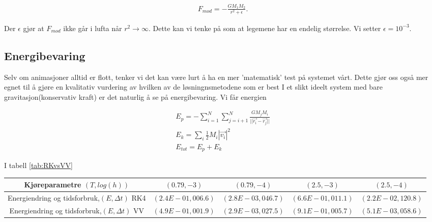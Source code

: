 \documentclass[11pt, twocolumn]{article}
\begin{document}
\begin{align}
F_{mod} = -\frac{GM_1M_2}{r^2 + \epsilon}.
\end{align}

Der $\epsilon$ gjør at $F_{mod}$ ikke går i lufta når $r^2 \rightarrow \infty$. 
Dette kan vi tenke på som at legemene har en endelig størrelse. 
Vi setter $\epsilon = 10^{-3}$. 

\subsection{Energibevaring}
Selv om animasjoner alltid er flott, tenker vi det kan være lurt å ha en mer
'matematisk' test på systemet vårt. Dette gjør oss også mer egnet til
å gjøre en kvalitativ vurdering av hvilken av de løsningnsmetodene som er best
I et slikt ideelt system med bare 
gravitasjon(konservativ kraft) er det naturlig å se på energibevaring. Vi får
energien

\begin{align}
E_{p} = - \sum_{i = 1}^{N} \sum_{j = i+1}^{N} \frac{GM_jM_i}{{||\vec{r_i} - \vec{r_j}||}} \\
E_{k} = \sum_{i} \frac{1}{2}M_i|\vec{v_i}|^2 \\
E_{tot} = E_{p} + E_{k}
\end{align}

I tabell \ref{tab:RKvsVV}


\begin{table*}[!ht]
\centering
\caption{En tabell som sammenligner relativ energiendring for de to metodene
RungeKutta4 og VelocityVerlet. Energiendringen regnes ut fra systemet starter
i ro ved $t_0 = 0$ til $T$ for to forskjellige steglengder
$h$.  Kjøretiden, $T$, måles i enhet $\tau_{crunch}$. Ideelt sett vil vi ha $\Delta E = 0$.}
\label{tab:RKvsVV}
\vspace{0.5cm}
\begin{tabular}{ccccc}
Kjøreparametre $(T, log(h))$ & $(0.79,-3)$ & $(0.79,-4)$ & $(2.5,-3)$ & $(2.5,-4)$ \\
\hline 
Energiendring og tidsforbruk,$(E,\Delta t)$ RK4 & $(2.4E-01, 006.6)$ & $(2.8E-03, 046.7)$ & $(6.6E-01, 011.1)$ & $(2.2E-02, 120.8)$ \\
Energiendring og tidsforbruk,$(E,\Delta t)$ VV & $(4.9E-01, 001.9)$ & $(2.9E-03, 027.5)$ & $(9.1E-01, 005.7)$ & $(5.1E-03, 058.6)$ \\
\hline
\end{tabular}
\end{table*}




\printbibliography
\end{document}
